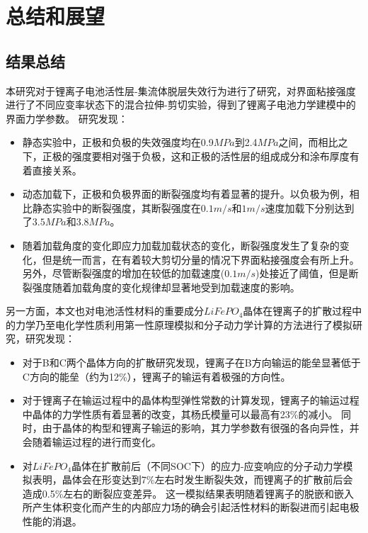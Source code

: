 \chapter{总结和展望}
\section{结果总结}
本研究对于锂离子电池活性层-集流体脱层失效行为进行了研究，对界面粘接强度进行了不同应变率状态下的混合拉伸-剪切实验，得到了锂离子电池力学建模中的界面力学参数。 研究发现：
\begin{itemize}
	\item 静态实验中，正极和负极的失效强度均在0.9$MPa$到2.4$MPa$之间，而相比之下，正极的强度要相对强于负极，这和正极的活性层的组成成分和涂布厚度有着直接关系。
	\item 动态加载下，正极和负极界面的断裂强度均有着显著的提升。以负极为例，相比静态实验中的断裂强度，其断裂强度在$0.1m/s$和$1m/s$速度加载下分别达到了$3.5MPa$和$3.8MPa$。
	\item 随着加载角度的变化即应力加载加载状态的变化，断裂强度发生了复杂的变化，但是统一而言，在有着较大剪切分量的情况下界面粘接强度会有所上升。 另外，尽管断裂强度的增加在较低的加载速度($0.1m/s$)处接近了阈值，但是断裂强度随着加载角度的变化规律却显著地受到加载速度的影响。
\end{itemize}
另一方面，本文也对电池活性材料的重要成分$LiFePO_4$晶体在锂离子的扩散过程中的力学乃至电化学性质利用第一性原理模拟和分子动力学计算的方法进行了模拟研究，研究发现：
\begin{itemize}
	\item 对于B和C两个晶体方向的扩散研究发现，锂离子在B方向输运的能垒显著低于C方向的能垒（约为12\%），锂离子的输运有着极强的方向性。 
	\item 对于锂离子在输运过程中的晶体构型弹性常数的计算发现，锂离子的输运过程中晶体的力学性质有着显著的改变，其杨氏模量可以最高有23\%的减小。 同时，由于晶体的构型和锂离子输运的影响，其力学参数有很强的各向异性，并会随着输运过程的进行而变化。
	\item 对$LiFePO_4$晶体在扩散前后（不同SOC下）的应力-应变响应的分子动力学模拟表明，晶体会在形变达到7\%左右时发生断裂失效，而锂离子的扩散前后会造成0.5\%左右的断裂应变差异。 这一模拟结果表明随着锂离子的脱嵌和嵌入所产生体积变化而产生的内部应力场的确会引起活性材料的断裂进而引起电极性能的消退。
\end{itemize}
